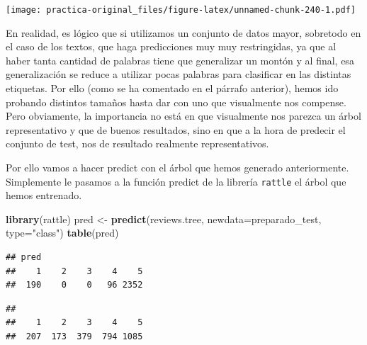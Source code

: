 \documentclass[spanish,]{article}
\newenvironment{Shaded}{\begin{snugshade}}{\end{snugshade}}
\newcommand{\KeywordTok}[1]{\textcolor[rgb]{0.13,0.29,0.53}{\textbf{#1}}}
\newcommand{\DataTypeTok}[1]{\textcolor[rgb]{0.13,0.29,0.53}{#1}}
\newcommand{\StringTok}[1]{\textcolor[rgb]{0.31,0.60,0.02}{#1}}
\newcommand{\CommentTok}[1]{\textcolor[rgb]{0.56,0.35,0.01}{\textit{#1}}}
\newcommand{\OperatorTok}[1]{\textcolor[rgb]{0.81,0.36,0.00}{\textbf{#1}}}
\newcommand{\NormalTok}[1]{#1}
\begin{document}
\texttt{[image: practica-original\_files/figure-latex/unnamed-chunk-240-1.pdf]}

En realidad, es lógico que si utilizamos un conjunto de datos mayor,
sobretodo en el caso de los textos, que haga predicciones muy muy
restringidas, ya que al haber tanta cantidad de palabras tiene que
generalizar un montón y al final, esa generalización se reduce a
utilizar pocas palabras para clasificar en las distintas etiquetas. Por
ello (como se ha comentado en el párrafo anterior), hemos ido probando
distintos tamaños hasta dar con uno que visualmente nos compense. Pero
obviamente, la importancia no está en que visualmente nos parezca un
árbol representativo y que de buenos resultados, sino en que a la hora
de predecir el conjunto de test, nos de resultado realmente
representativos.

Por ello vamos a hacer predict con el árbol que hemos generado
anteriormente. Simplemente le pasamos a la función predict de la
librería \texttt{rattle} el árbol que hemos entrenado.

\begin{Shaded}
\begin{Highlighting}[]
\KeywordTok{library}\NormalTok{(rattle)}
\NormalTok{pred <-}\StringTok{ }\KeywordTok{predict}\NormalTok{(reviews.tree, }\DataTypeTok{newdata=}\NormalTok{preparado_test, }\DataTypeTok{type=}\StringTok{"class"}\NormalTok{)}
\KeywordTok{table}\NormalTok{(pred)}
\end{Highlighting}
\end{Shaded}

\begin{verbatim}
## pred
##    1    2    3    4    5 
##  190    0    0   96 2352
\end{verbatim}

\begin{Shaded}
\end{Shaded}

\begin{verbatim}
## 
##    1    2    3    4    5 
##  207  173  379  794 1085
\end{verbatim}

\begin{Shaded}
\end{Shaded}
\end{document}

